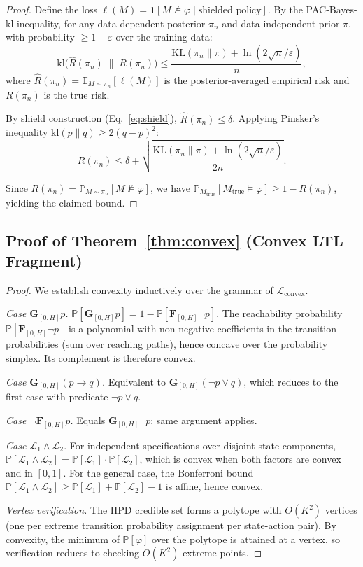 \documentclass[11pt]{article}
\newcommand{\KL}{\mathrm{KL}}
\newcommand{\E}{\mathbb{E}}
\newcommand{\Prob}{\mathbb{P}}
\newcommand{\cL}{\mathcal{L}}
\begin{document}
\begin{proof}
Define the loss $\ell(M) = \mathbf{1}[M \not\models \varphi \mid
\text{shielded policy}]$.  By the PAC-Bayes-kl inequality, for any
data-dependent posterior $\pi_n$ and data-independent prior $\pi$,
with probability $\geq 1 - \varepsilon$ over the training data:
\begin{equation}
  \mathrm{kl}\bigl(\hat{R}(\pi_n) \;\|\; R(\pi_n)\bigr) \leq
  \frac{\KL(\pi_n \| \pi) + \ln(2\sqrt{n}/\varepsilon)}{n},
\end{equation}
where $\hat{R}(\pi_n) = \E_{M \sim \pi_n}[\ell(M)]$ is the
posterior-averaged empirical risk and $R(\pi_n)$ is the true risk.

By shield construction (Eq.~\ref{eq:shield}),
$\hat{R}(\pi_n) \leq \delta$.  Applying Pinsker's inequality
$\mathrm{kl}(p \| q) \geq 2(q - p)^2$:
\begin{equation}
  R(\pi_n) \leq \delta + \sqrt{\frac{\KL(\pi_n \| \pi) +
    \ln(2\sqrt{n}/\varepsilon)}{2n}}.
\end{equation}

Since $R(\pi_n) = \Prob_{M \sim \pi_n}[M \not\models \varphi]$,
we have $\Prob_{M_{\mathrm{true}}}[M_{\mathrm{true}} \models
\varphi] \geq 1 - R(\pi_n)$, yielding the claimed bound.
\end{proof}

\subsection{Proof of Theorem~\ref{thm:convex}
  (Convex LTL Fragment)}

\begin{proof}
We establish convexity inductively over the grammar of
$\cL_{\mathrm{convex}}$.

\emph{Case $\mathbf{G}_{[0,H]} p$.}
$\Prob[\mathbf{G}_{[0,H]} p] = 1 - \Prob[\mathbf{F}_{[0,H]} \neg p]$.
The reachability probability $\Prob[\mathbf{F}_{[0,H]} \neg p]$ is a
polynomial with non-negative coefficients in the transition
probabilities (sum over reaching paths), hence concave over the
probability simplex.  Its complement is therefore convex.

\emph{Case $\mathbf{G}_{[0,H]} (p \to q)$.}
Equivalent to $\mathbf{G}_{[0,H]} (\neg p \vee q)$, which reduces to
the first case with predicate $\neg p \vee q$.

\emph{Case $\neg\mathbf{F}_{[0,H]} p$.}
Equals $\mathbf{G}_{[0,H]} \neg p$; same argument applies.

\emph{Case $\cL_1 \wedge \cL_2$.}
For independent specifications over disjoint state components,
$\Prob[\cL_1 \wedge \cL_2] = \Prob[\cL_1] \cdot \Prob[\cL_2]$,
which is convex when both factors are convex and in $[0,1]$.
For the general case, the Bonferroni bound
$\Prob[\cL_1 \wedge \cL_2] \geq \Prob[\cL_1] + \Prob[\cL_2] - 1$
is affine, hence convex.

\emph{Vertex verification.}
The HPD credible set forms a polytope with $O(K^2)$ vertices (one per
extreme transition probability assignment per state-action pair).  By
convexity, the minimum of $\Prob[\varphi]$ over the polytope is
attained at a vertex, so verification reduces to checking $O(K^2)$
extreme points.
\end{proof}
\end{document}
